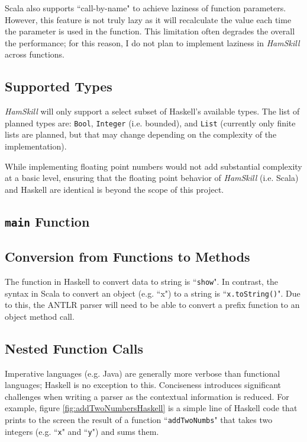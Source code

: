 \documentclass{report}
\begin{document}
Scala also supports ``call-by-name" to achieve laziness of function parameters.  However, this feature is not truly lazy as it will recalculate the value each time the parameter is used in the function.  This limitation often degrades the overall the performance; for this reason, I do not plan to implement laziness in \emph{HamSkill} across functions.

\subsection{Supported Types}

\emph{HamSkill} will only support a select subset of Haskell's available types.  The list of planned types are: {\tt Bool}, {\tt Integer} (i.e. bounded), and {\tt List} (currently only finite lists are planned, but that may change depending on the complexity of the implementation).

While implementing floating point numbers would not add substantial complexity at a basic level, ensuring that the floating point behavior of \emph{HamSkill} (i.e. Scala) and Haskell are identical is beyond the scope of this project.

\subsection{\texttt{main} Function}

\subsection{Conversion from Functions to Methods}

The function in Haskell to convert data to string is ``{\tt show}". In contrast, the syntax in Scala to convert an object (e.g. ``x") to a string is ``{\tt x.toString()}".  Due to this, the ANTLR parser will need to be able to convert a prefix function to an object method call.

\subsection{Nested Function Calls}\label{sec:nestedFunctionCalls}

Imperative languages (e.g. Java) are generally more verbose than functional languages; Haskell is no exception to this.  Conciseness introduces significant challenges when writing a parser as the contextual information is reduced.  For example, figure \ref{fig:addTwoNumbersHaskell} is a simple line of Haskell code that prints to the screen the result of a function ``{\tt addTwoNumbs}" that takes two integers (e.g. ``{\tt x}" and ``{\tt y}") and sums them. 
\end{document}
